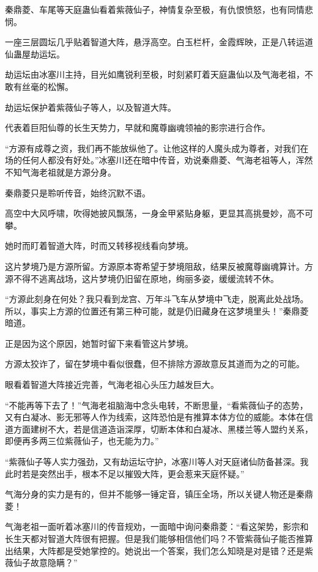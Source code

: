 \begin{this_body}
秦鼎菱、车尾等天庭蛊仙看着紫薇仙子，神情复杂至极，有仇恨愤怒，也有同情悲悯。

一座三层圆坛几乎贴着智道大阵，悬浮高空。白玉栏杆，金霞辉映，正是八转运道仙蛊屋劫运坛。

劫运坛由冰塞川主持，目光如鹰锐利至极，时刻紧盯着天庭蛊仙以及气海老祖，不敢有丝毫的松懈。

劫运坛保护着紫薇仙子等人，以及智道大阵。

代表着巨阳仙尊的长生天势力，早就和魔尊幽魂领袖的影宗进行合作。

“方源有成尊之资，我们再不能放纵他了。让他这样的人魔头成为尊者，对我们在场的任何人都没有好处。”冰塞川还在暗中传音，劝说秦鼎菱、气海老祖等人，浑然不知气海老祖就是方源分身。

秦鼎菱只是聆听传音，始终沉默不语。

高空中大风呼啸，吹得她披风飘荡，一身金甲紧贴身躯，更显其高挑曼妙，高不可攀。

她时而盯着智道大阵，时而又转移视线看向梦境。

这片梦境乃是方源所留。方源原本寄希望于梦境阻敌，结果反被魔尊幽魂算计。方源不得不逃离战场，这片梦境仍旧留在原地，绚丽多姿，缓缓流转不休。

“方源此刻身在何处？我只看到龙宫、万年斗飞车从梦境中飞走，脱离此处战场。所以，事实上方源的位置还有第三种可能，就是仍旧藏身在这梦境里头！”秦鼎菱暗道。

正是因为这个原因，她暂时留下来看管这片梦境。

方源太狡诈了，留在梦境中看似很蠢，但不排除方源故意反其道而为之的可能。

眼看着智道大阵接近完善，气海老祖心头压力越发巨大。

“不能再等下去了！”气海老祖脑海中念头电转，不断思量，“看紫薇仙子的态势，又有白凝冰、影无邪等人作为线索，这阵恐怕是有推算本体方位的威能。本体在信道方面建树不大，若是信道造诣深厚，切断本体和白凝冰、黑楼兰等人盟约关系，即便再多两三位紫薇仙子，也无能为力。”

“紫薇仙子等人实力强劲，又有劫运坛守护，冰塞川等人对天庭诸仙防备甚深。我此时若是突然出手，根本不足以摧毁大阵，更会惹来天庭怀疑。”

气海分身的实力是有的，但并不能够一锤定音，镇压全场，所以关键人物还是秦鼎菱！

气海老祖一面听着冰塞川的传音规劝，一面暗中询问秦鼎菱：“看这架势，影宗和长生天都对智道大阵很有把握。但是我们能够相信他们吗？不管紫薇仙子能否推算出结果，大阵都是受她掌控的。她说出一个答案，我们怎么知晓是对是错？还是紫薇仙子故意隐瞒？”


\end{this_body}
